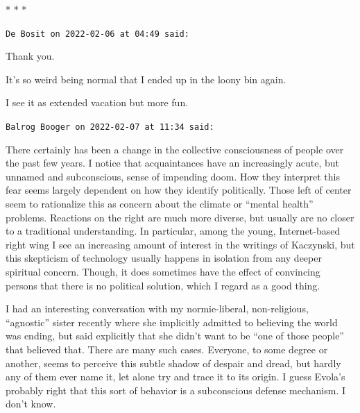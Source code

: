 
\begin{center}* * *\end{center}

\begin{footnotesize}
\begin{sffamily}
\texttt{De Bosit on 2022-02-06 at 04:49 said:}

Thank you.

It's so weird being normal that I ended up in the loony bin again.

I see it as extended vacation but more fun.

\hfill

\texttt{Balrog Booger on 2022-02-07 at 11:34 said:}

There certainly has been a change in the collective consciousness of people over the past few years. I notice that acquaintances have an increasingly acute, but unnamed and subconscious, sense of impending doom. How they interpret this fear seems largely dependent on how they identify politically. Those left of center seem to rationalize this as concern about the climate or ``mental health'' problems. Reactions on the right are much more diverse, but usually are no closer to a traditional understanding. In particular, among the young, Internet-based right wing I see an increasing amount of interest in the writings of Kaczynski, but this skepticism of technology usually happens in isolation from any deeper spiritual concern. Though, it does sometimes have the effect of convincing persons that there is no political solution, which I regard as a good thing.

I had an interesting conversation with my normie-liberal, non-religious, ``agnostic'' sister recently where she implicitly admitted to believing the world was ending, but said explicitly that she didn't want to be ``one of those people'' that believed that. There are many such cases. Everyone, to some degree or another, seems to perceive this subtle shadow of despair and dread, but hardly any of them ever name it, let alone try and trace it to its origin. I guess Evola's probably right that this sort of behavior is a subconscious defense mechanism. I don't know.

\end{sffamily}
\end{footnotesize}

